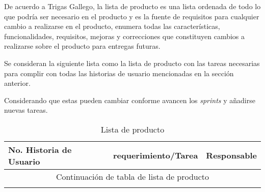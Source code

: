 De acuerdo a Trigas Gallego\cite{manuel_trigas_gallego_metodologiscrum_2020}, la lista de producto es una lista ordenada de todo lo que podría ser necesario en el producto y es la fuente de requisitos para cualquier cambio a realizarse en el producto, enumera todas las características, funcionalidades, requisitos, mejoras y correcciones que constituyen cambios a realizarse sobre el producto para entregas futuras.


Se consideran la siguiente lista como la lista de producto con las tareas necesarias para complir con todas las historias de usuario mencionadas en la sección anterior.


Considerando que estas pueden cambiar conforme avancen los \textit{sprints} y añadirse nuevas tareas.


\begin{longtable}{ p{2cm} | p{10cm} | p{2cm} }

	\hline
	No. Historia de Usuario & requerimiento/Tarea &  Responsable \\[0.5cm]
	\hline
	\hline

	\endfirsthead

	\multicolumn{3}{c}{Continuación de tabla de lista de producto }\\
	\hline
	\hline
	\endhead

	\hline
	\hline
	\caption{Lista de producto}
	\endlastfoot



\end{longtable}
